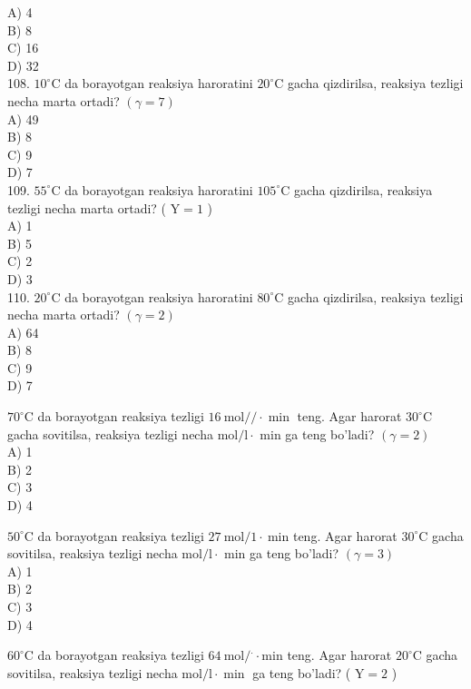 A) 4\\
B) 8\\
C) 16\\
D) 32\\
108. $10^{\circ} \mathrm{C}$ da borayotgan reaksiya haroratini $20^{\circ} \mathrm{C}$ gacha qizdirilsa, reaksiya tezligi necha marta ortadi? $(\gamma=7)$\\
A) 49\\
B) 8\\
C) 9\\
D) 7\\
109. $55^{\circ} \mathrm{C}$ da borayotgan reaksiya haroratini $105^{\circ} \mathrm{C}$ gacha qizdirilsa, reaksiya tezligi necha marta ortadi? ( $\mathrm{Y}=1$ )\\
A) 1\\
B) 5\\
C) 2\\
D) 3\\
110. $20^{\circ} \mathrm{C}$ da borayotgan reaksiya haroratini $80^{\circ} \mathrm{C}$ gacha qizdirilsa, reaksiya tezligi necha marta ortadi? $(\gamma=2)$\\
A) 64\\
B) 8\\
C) 9\\
D) 7
  \item $70^{\circ} \mathrm{C}$ da borayotgan reaksiya tezligi $16 \mathrm{~mol} / / \cdot \min$ teng. Agar harorat $30^{\circ} \mathrm{C}$ gacha sovitilsa, reaksiya tezligi necha $\mathrm{mol} / \mathrm{l} \cdot$ min ga teng bo'ladi? $(\gamma=2)$\\
A) 1\\
B) 2\\
C) 3\\
D) 4\\
  \item $50^{\circ} \mathrm{C}$ da borayotgan reaksiya tezligi $27 \mathrm{~mol} / 1 \cdot \mathrm{~min}$ teng. Agar harorat $30^{\circ} \mathrm{C}$ gacha sovitilsa, reaksiya tezligi necha $\mathrm{mol} / \mathrm{l} \cdot$ min ga teng bo'ladi? $(\gamma=3)$\\
A) 1\\
B) 2\\
C) 3\\
D) 4
  \item $60^{\circ} \mathrm{C}$ da borayotgan reaksiya tezligi $64 \mathrm{~mol} /{ }^{\cdot} \cdot \mathrm{min}$ teng. Agar harorat $20^{\circ} \mathrm{C}$ gacha sovitilsa, reaksiya tezligi necha $\mathrm{mol} / \mathrm{l} \cdot \min$ ga teng bo'ladi? ( $\mathrm{Y}=2$ )\\
